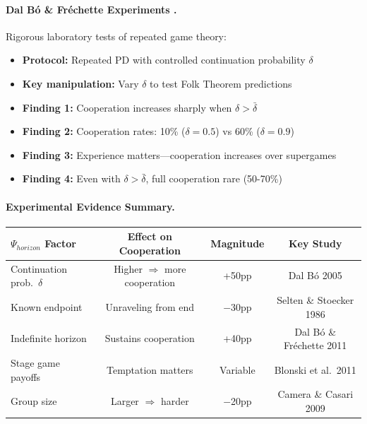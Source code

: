 \paragraph{Dal B\'{o} \& Fr\'{e}chette Experiments \citep{dalbo2011evolution,dalbo2018determinants}.}
Rigorous laboratory tests of repeated game theory:
\begin{itemize}[nosep]
    \item \textbf{Protocol:} Repeated PD with controlled continuation probability $\delta$
    \item \textbf{Key manipulation:} Vary $\delta$ to test Folk Theorem predictions
    \item \textbf{Finding 1:} Cooperation increases sharply when $\delta > \bar{\delta}$
    \item \textbf{Finding 2:} Cooperation rates: 10\% ($\delta = 0.5$) vs 60\% ($\delta = 0.9$)
    \item \textbf{Finding 3:} Experience matters---cooperation increases over supergames
    \item \textbf{Finding 4:} Even with $\delta > \bar{\delta}$, full cooperation rare (50-70\%)
\end{itemize}

\paragraph{Experimental Evidence Summary.}
\begin{center}
\small
\begin{tabular}{@{}lccc@{}}
\toprule
\textbf{$\Psi_{horizon}$ Factor} & \textbf{Effect on Cooperation} & \textbf{Magnitude} & \textbf{Key Study} \\
\midrule
Continuation prob.\ $\delta$ & Higher $\Rightarrow$ more cooperation & +50pp & Dal B\'{o} 2005 \\
Known endpoint & Unraveling from end & $-$30pp & Selten \& Stoecker 1986 \\
Indefinite horizon & Sustains cooperation & +40pp & Dal B\'{o} \& Fr\'{e}chette 2011 \\
Stage game payoffs & Temptation matters & Variable & Blonski et al.\ 2011 \\
Group size & Larger $\Rightarrow$ harder & $-$20pp & Camera \& Casari 2009 \\
\bottomrule
\end{tabular}
\end{center}

